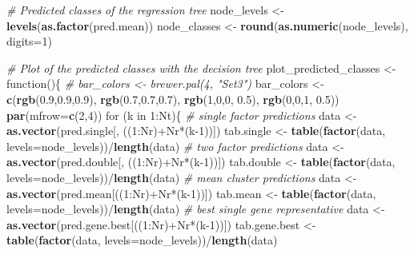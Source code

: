 \documentclass[]{article}
\newenvironment{Shaded}{\begin{snugshade}}{\end{snugshade}}
\newcommand{\KeywordTok}[1]{\textcolor[rgb]{0.13,0.29,0.53}{\textbf{{#1}}}}
\newcommand{\DataTypeTok}[1]{\textcolor[rgb]{0.13,0.29,0.53}{{#1}}}
\newcommand{\DecValTok}[1]{\textcolor[rgb]{0.00,0.00,0.81}{{#1}}}
\newcommand{\FloatTok}[1]{\textcolor[rgb]{0.00,0.00,0.81}{{#1}}}
\newcommand{\StringTok}[1]{\textcolor[rgb]{0.31,0.60,0.02}{{#1}}}
\newcommand{\CommentTok}[1]{\textcolor[rgb]{0.56,0.35,0.01}{\textit{{#1}}}}
\newcommand{\NormalTok}[1]{{#1}}
\begin{document}
\begin{Shaded}
\begin{Highlighting}[]
\CommentTok{# Predicted classes of the regression tree}
\NormalTok{node_levels <-}\StringTok{ }\KeywordTok{levels}\NormalTok{(}\KeywordTok{as.factor}\NormalTok{(pred.mean))}
\NormalTok{node_classes <-}\StringTok{ }\KeywordTok{round}\NormalTok{(}\KeywordTok{as.numeric}\NormalTok{(node_levels), }\DataTypeTok{digits=}\DecValTok{1}\NormalTok{)}

\CommentTok{# Plot of the predicted classes with the decision tree}
\NormalTok{plot_predicted_classes <-}\StringTok{ }\NormalTok{function()\{}
  \CommentTok{# bar_colors <- brewer.pal(4, "Set3")}
  \NormalTok{bar_colors <-}\StringTok{ }\KeywordTok{c}\NormalTok{(}\KeywordTok{rgb}\NormalTok{(}\FloatTok{0.9}\NormalTok{,}\FloatTok{0.9}\NormalTok{,}\FloatTok{0.9}\NormalTok{), }
                  \KeywordTok{rgb}\NormalTok{(}\FloatTok{0.7}\NormalTok{,}\FloatTok{0.7}\NormalTok{,}\FloatTok{0.7}\NormalTok{),}
                  \KeywordTok{rgb}\NormalTok{(}\DecValTok{1}\NormalTok{,}\DecValTok{0}\NormalTok{,}\DecValTok{0}\NormalTok{, }\FloatTok{0.5}\NormalTok{),}
                  \KeywordTok{rgb}\NormalTok{(}\DecValTok{0}\NormalTok{,}\DecValTok{0}\NormalTok{,}\DecValTok{1}\NormalTok{, }\FloatTok{0.5}\NormalTok{))}
  \KeywordTok{par}\NormalTok{(}\DataTypeTok{mfrow=}\KeywordTok{c}\NormalTok{(}\DecValTok{2}\NormalTok{,}\DecValTok{4}\NormalTok{))}
  \NormalTok{for (k in }\DecValTok{1}\NormalTok{:Nt)\{}
    \CommentTok{# single factor predictions}
    \NormalTok{data <-}\StringTok{ }\KeywordTok{as.vector}\NormalTok{(pred.single[, ((}\DecValTok{1}\NormalTok{:Nr)+Nr*(k}\DecValTok{-1}\NormalTok{))])}
    \NormalTok{tab.single <-}\StringTok{ }\KeywordTok{table}\NormalTok{(}\KeywordTok{factor}\NormalTok{(data, }\DataTypeTok{levels=}\NormalTok{node_levels))/}\KeywordTok{length}\NormalTok{(data)}
    \CommentTok{# two factor predictions}
    \NormalTok{data <-}\StringTok{ }\KeywordTok{as.vector}\NormalTok{(pred.double[, ((}\DecValTok{1}\NormalTok{:Nr)+Nr*(k}\DecValTok{-1}\NormalTok{))])}
    \NormalTok{tab.double <-}\StringTok{ }\KeywordTok{table}\NormalTok{(}\KeywordTok{factor}\NormalTok{(data, }\DataTypeTok{levels=}\NormalTok{node_levels))/}\KeywordTok{length}\NormalTok{(data)}
    \CommentTok{# mean cluster predictions}
    \NormalTok{data <-}\StringTok{ }\KeywordTok{as.vector}\NormalTok{(pred.mean[((}\DecValTok{1}\NormalTok{:Nr)+Nr*(k}\DecValTok{-1}\NormalTok{))])}
    \NormalTok{tab.mean <-}\StringTok{ }\KeywordTok{table}\NormalTok{(}\KeywordTok{factor}\NormalTok{(data, }\DataTypeTok{levels=}\NormalTok{node_levels))/}\KeywordTok{length}\NormalTok{(data)}
    \CommentTok{# best single gene representative}
    \NormalTok{data <-}\StringTok{ }\KeywordTok{as.vector}\NormalTok{(pred.gene.best[((}\DecValTok{1}\NormalTok{:Nr)+Nr*(k}\DecValTok{-1}\NormalTok{))])}
    \NormalTok{tab.gene.best <-}\StringTok{ }\KeywordTok{table}\NormalTok{(}\KeywordTok{factor}\NormalTok{(data, }\DataTypeTok{levels=}\NormalTok{node_levels))/}\KeywordTok{length}\NormalTok{(data)}
    

\end{Highlighting}
\end{Shaded}
\end{document}
